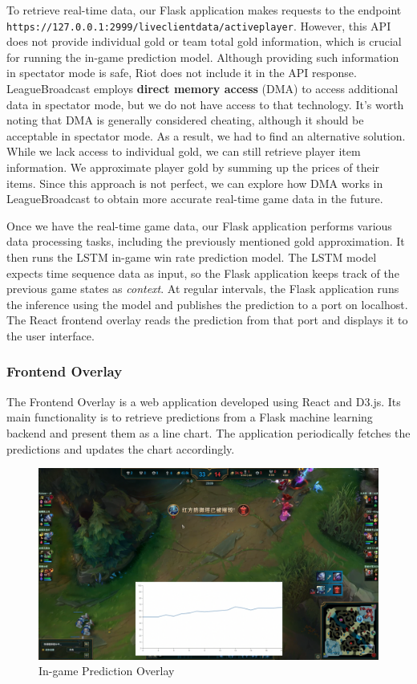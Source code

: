 \documentclass[11pt,a4paper,oneside]{report}
\begin{document}
To retrieve real-time data, our Flask application makes requests to the endpoint \\ \texttt{https://127.0.0.1:2999/liveclientdata/activeplayer}. However, this API does not provide individual gold or team total gold information, which is crucial for running the in-game prediction model. Although providing such information in spectator mode is safe, Riot does not include it in the API response. LeagueBroadcast \cite{floh22} employs \textbf{direct memory access} (DMA) to access additional data in spectator mode, but we do not have access to that technology. It's worth noting that DMA is generally considered cheating, although it should be acceptable in spectator mode. As a result, we had to find an alternative solution. While we lack access to individual gold, we can still retrieve player item information. We approximate player gold by summing up the prices of their items. Since this approach is not perfect, we can explore how DMA works in LeagueBroadcast \cite{floh22} to obtain more accurate real-time game data in the future.

Once we have the real-time game data, our Flask application performs various data processing tasks, including the previously mentioned gold approximation. It then runs the LSTM in-game win rate prediction model. The LSTM model expects time sequence data as input, so the Flask application keeps track of the previous game states as \textit{context}. At regular intervals, the Flask application runs the inference using the model and publishes the prediction to a port on localhost. The React frontend overlay reads the prediction from that port and displays it to the user interface.

\subsubsection{Frontend Overlay}

The Frontend Overlay is a web application developed using React and D3.js. Its main functionality is to retrieve predictions from a Flask machine learning backend and present them as a line chart. The application periodically fetches the predictions and updates the chart accordingly.

\begin{figure}[htbp]
  \centering
  \includegraphics[width=\textwidth]{assets/in_game_pred.png}
  \caption{In-game Prediction Overlay}
  \label{fig:in_game_pred}
\end{figure}
\end{document}
